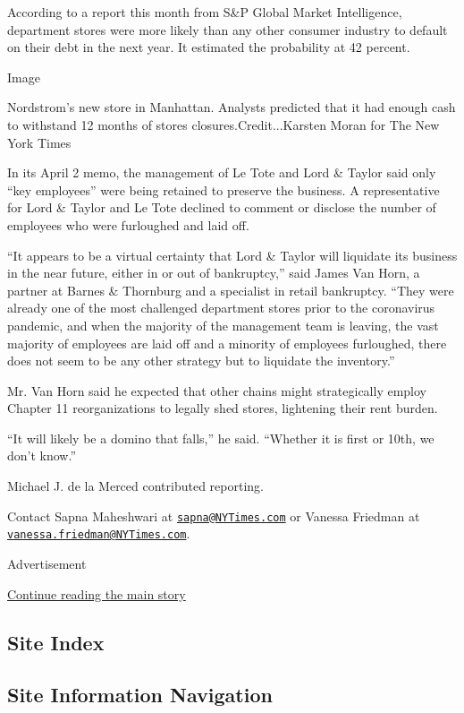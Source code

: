 According to a report this month from S\&P Global Market Intelligence,
department stores were more likely than any other consumer industry to
default on their debt in the next year. It estimated the probability at
42 percent.

Image

Nordstrom's new store in Manhattan. Analysts predicted that it had
enough cash to withstand 12 months of stores closures.Credit...Karsten
Moran for The New York Times

In its April 2 memo, the management of Le Tote and Lord \& Taylor said
only ``key employees'' were being retained to preserve the business. A
representative for Lord \& Taylor and Le Tote declined to comment or
disclose the number of employees who were furloughed and laid off.

``It appears to be a virtual certainty that Lord \& Taylor will
liquidate its business in the near future, either in or out of
bankruptcy,'' said James Van Horn, a partner at Barnes \& Thornburg and
a specialist in retail bankruptcy. ``They were already one of the most
challenged department stores prior to the coronavirus pandemic, and when
the majority of the management team is leaving, the vast majority of
employees are laid off and a minority of employees furloughed, there
does not seem to be any other strategy but to liquidate the inventory.''

Mr. Van Horn said he expected that other chains might strategically
employ Chapter 11 reorganizations to legally shed stores, lightening
their rent burden.

``It will likely be a domino that falls,'' he said. ``Whether it is
first or 10th, we don't know.''

Michael J. de la Merced contributed reporting.

Contact Sapna Maheshwari at
\href{mailto:sapna@NYTimes.com}{\nolinkurl{sapna@NYTimes.com}} or
Vanessa Friedman at
\href{mailto:vanessa.friedman@NYTimes.com}{\nolinkurl{vanessa.friedman@NYTimes.com}}.

Advertisement

\protect\hyperlink{after-bottom}{Continue reading the main story}

\hypertarget{site-index}{%
\subsection{Site Index}\label{site-index}}

\hypertarget{site-information-navigation}{%
\subsection{Site Information
Navigation}\label{site-information-navigation}}

